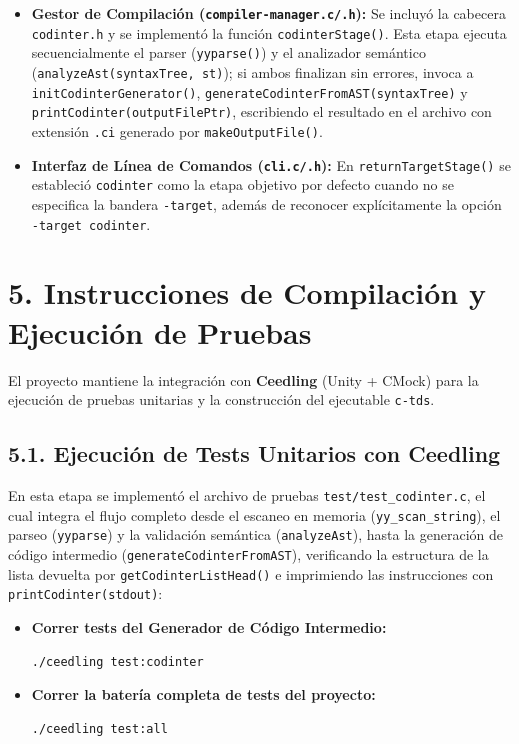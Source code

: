 \documentclass[12pt, a4paper]{article}
\begin{document}
\begin{itemize}
    \item \textbf{Gestor de Compilación (\texttt{compiler-manager.c/.h}):} Se incluyó la cabecera \texttt{codinter.h} y se implementó la función \texttt{codinterStage()}. Esta etapa ejecuta secuencialmente el parser (\texttt{yyparse()}) y el analizador semántico (\texttt{analyzeAst(syntaxTree, st)}); si ambos finalizan sin errores, invoca a \texttt{initCodinterGenerator()}, \texttt{generateCodinterFromAST(syntaxTree)} y \texttt{printCodinter(outputFilePtr)}, escribiendo el resultado en el archivo con extensión \texttt{.ci} generado por \texttt{makeOutputFile()}.
    \item \textbf{Interfaz de Línea de Comandos (\texttt{cli.c/.h}):} En \texttt{returnTargetStage()} se estableció \texttt{codinter} como la etapa objetivo por defecto cuando no se especifica la bandera \texttt{-target}, además de reconocer explícitamente la opción \texttt{-target codinter}.
\end{itemize}

\section{5. Instrucciones de Compilación y Ejecución de Pruebas}
El proyecto mantiene la integración con \textbf{Ceedling} (Unity + CMock) para la ejecución de pruebas unitarias y la construcción del ejecutable \texttt{c-tds}.

\subsection*{5.1. Ejecución de Tests Unitarios con Ceedling}
En esta etapa se implementó el archivo de pruebas \texttt{test/test\_codinter.c}, el cual integra el flujo completo desde el escaneo en memoria (\texttt{yy\_scan\_string}), el parseo (\texttt{yyparse}) y la validación semántica (\texttt{analyzeAst}), hasta la generación de código intermedio (\texttt{generateCodinterFromAST}), verificando la estructura de la lista devuelta por \texttt{getCodinterListHead()} e imprimiendo las instrucciones con \texttt{printCodinter(stdout)}:

\begin{itemize}
    \item \textbf{Correr tests del Generador de Código Intermedio:}
\begin{verbatim}
./ceedling test:codinter
\end{verbatim}
    \item \textbf{Correr la batería completa de tests del proyecto:}
\begin{verbatim}
./ceedling test:all
\end{verbatim}
\end{itemize}
\end{document}
